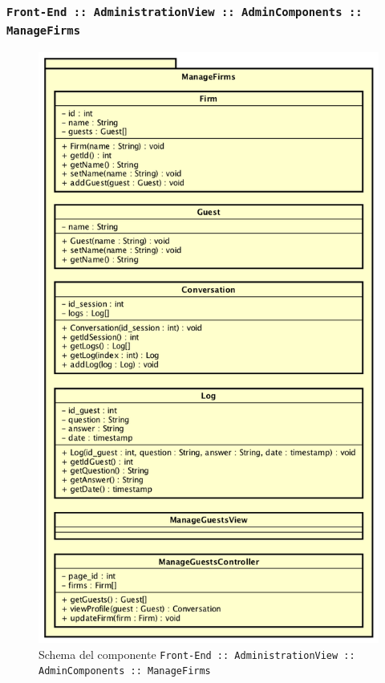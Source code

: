 \documentclass[../DefinizioneDiProdotto.tex]{subfiles}
\begin{document}
	\subsubsection{ \texttt{Front-End :: AdministrationView :: AdminComponents :: ManageFirms}}
		\begin{figure}[!h]
			\centering
			\includegraphics[scale=0.5]{Architettura/Front-End/Administration/AdminComponents/ManageFirms.png}
			\caption{Schema del componente \texttt{Front-End :: AdministrationView :: AdminComponents :: ManageFirms}}
		\end{figure}
\end{document}
